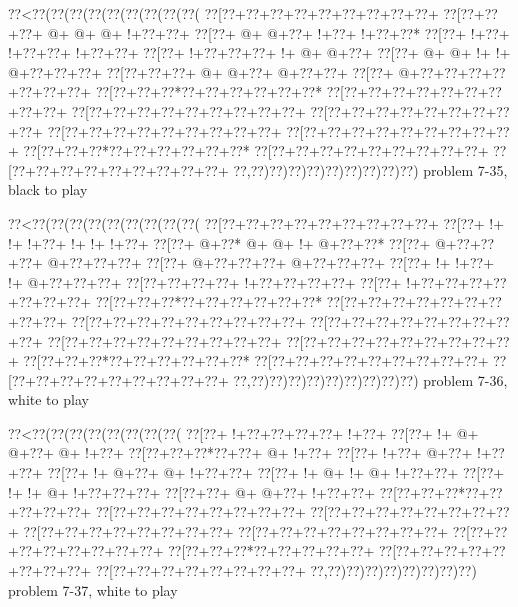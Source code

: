 \vbox{\vbox{\goo
\0??<\0??(\0??(\0??(\0??(\0??(\0??(\0??(\0??(\0??(
\0??[\0??+\0??+\0??+\0??+\0??+\0??+\0??+\0??+\0??+
\0??[\0??+\0??+\0??+\- @+\- @+\- @+\- !+\0??+\0??+
\0??[\0??+\- @+\- @+\0??+\- !+\0??+\- !+\0??+\0??*
\0??[\0??+\- !+\0??+\- !+\0??+\0??+\- !+\0??+\0??+
\0??[\0??+\- !+\0??+\0??+\0??+\- !+\- @+\- @+\0??+
\0??[\0??+\- @+\- @+\- !+\- !+\- @+\0??+\0??+\0??+
\0??[\0??+\0??+\0??+\- @+\- @+\0??+\- @+\0??+\0??+
\0??[\0??+\- @+\0??+\0??+\0??+\0??+\0??+\0??+\0??+
\0??[\0??+\0??+\0??*\0??+\0??+\0??+\0??+\0??+\0??*
\0??[\0??+\0??+\0??+\0??+\0??+\0??+\0??+\0??+\0??+
\0??[\0??+\0??+\0??+\0??+\0??+\0??+\0??+\0??+\0??+
\0??[\0??+\0??+\0??+\0??+\0??+\0??+\0??+\0??+\0??+
\0??[\0??+\0??+\0??+\0??+\0??+\0??+\0??+\0??+\0??+
\0??[\0??+\0??+\0??+\0??+\0??+\0??+\0??+\0??+\0??+
\0??[\0??+\0??+\0??*\0??+\0??+\0??+\0??+\0??+\0??*
\0??[\0??+\0??+\0??+\0??+\0??+\0??+\0??+\0??+\0??+
\0??[\0??+\0??+\0??+\0??+\0??+\0??+\0??+\0??+\0??+
\0??,\0??)\0??)\0??)\0??)\0??)\0??)\0??)\0??)\0??)
}
\hfil problem 7-35, black to play\hfil\break
}

\vbox{\vbox{\goo
\0??<\0??(\0??(\0??(\0??(\0??(\0??(\0??(\0??(\0??(
\0??[\0??+\0??+\0??+\0??+\0??+\0??+\0??+\0??+\0??+
\0??[\0??+\- !+\- !+\- !+\0??+\- !+\- !+\- !+\0??+
\0??[\0??+\- @+\0??*\- @+\- @+\- !+\- @+\0??+\0??*
\0??[\0??+\- @+\0??+\0??+\0??+\- @+\0??+\0??+\0??+
\0??[\0??+\- @+\0??+\0??+\0??+\- @+\0??+\0??+\0??+
\0??[\0??+\- !+\- !+\0??+\- !+\- @+\0??+\0??+\0??+
\0??[\0??+\0??+\0??+\0??+\- !+\0??+\0??+\0??+\0??+
\0??[\0??+\- !+\0??+\0??+\0??+\0??+\0??+\0??+\0??+
\0??[\0??+\0??+\0??*\0??+\0??+\0??+\0??+\0??+\0??*
\0??[\0??+\0??+\0??+\0??+\0??+\0??+\0??+\0??+\0??+
\0??[\0??+\0??+\0??+\0??+\0??+\0??+\0??+\0??+\0??+
\0??[\0??+\0??+\0??+\0??+\0??+\0??+\0??+\0??+\0??+
\0??[\0??+\0??+\0??+\0??+\0??+\0??+\0??+\0??+\0??+
\0??[\0??+\0??+\0??+\0??+\0??+\0??+\0??+\0??+\0??+
\0??[\0??+\0??+\0??*\0??+\0??+\0??+\0??+\0??+\0??*
\0??[\0??+\0??+\0??+\0??+\0??+\0??+\0??+\0??+\0??+
\0??[\0??+\0??+\0??+\0??+\0??+\0??+\0??+\0??+\0??+
\0??,\0??)\0??)\0??)\0??)\0??)\0??)\0??)\0??)\0??)
}
\hfil problem 7-36, white to play\hfil\break
}

\vbox{\vbox{\goo
\0??<\0??(\0??(\0??(\0??(\0??(\0??(\0??(\0??(
\0??[\0??+\- !+\0??+\0??+\0??+\0??+\- !+\0??+
\0??[\0??+\- !+\- @+\- @+\0??+\- @+\- !+\0??+
\0??[\0??+\0??+\0??*\0??+\0??+\- @+\- !+\0??+
\0??[\0??+\- !+\0??+\- @+\0??+\- !+\0??+\0??+
\0??[\0??+\- !+\- @+\0??+\- @+\- !+\0??+\0??+
\0??[\0??+\- !+\- @+\- !+\- @+\- !+\0??+\0??+
\0??[\0??+\- !+\- !+\- @+\- !+\0??+\0??+\0??+
\0??[\0??+\0??+\- @+\- @+\0??+\- !+\0??+\0??+
\0??[\0??+\0??+\0??*\0??+\0??+\0??+\0??+\0??+
\0??[\0??+\0??+\0??+\0??+\0??+\0??+\0??+\0??+
\0??[\0??+\0??+\0??+\0??+\0??+\0??+\0??+\0??+
\0??[\0??+\0??+\0??+\0??+\0??+\0??+\0??+\0??+
\0??[\0??+\0??+\0??+\0??+\0??+\0??+\0??+\0??+
\0??[\0??+\0??+\0??+\0??+\0??+\0??+\0??+\0??+
\0??[\0??+\0??+\0??*\0??+\0??+\0??+\0??+\0??+
\0??[\0??+\0??+\0??+\0??+\0??+\0??+\0??+\0??+
\0??[\0??+\0??+\0??+\0??+\0??+\0??+\0??+\0??+
\0??,\0??)\0??)\0??)\0??)\0??)\0??)\0??)\0??)
}
\hfil problem 7-37, white to play\hfil\break
}

